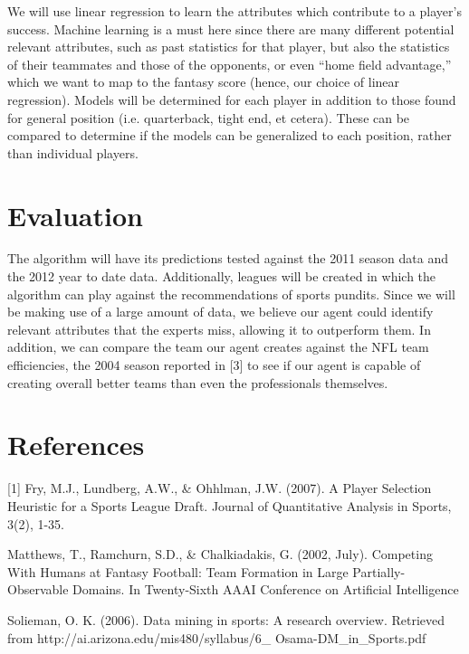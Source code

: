 \documentclass[a4paper,11pt, onecolumn]{article}
\begin{document}
We will use linear regression to learn the attributes which contribute to a player’s success. Machine learning is a must here since there are many different potential relevant attributes, such as past statistics for that player, but also the statistics of their teammates and those of the opponents, or even “home field advantage,” which we want to map to the fantasy score (hence, our choice of linear regression). Models will be determined for each player in addition to those found for general position (i.e. quarterback, tight end, et cetera). These can be compared to determine if the models can be generalized to each position, rather than individual players.

\section{Evaluation}
The algorithm will have its predictions tested against the 2011 season data and the 2012 year to date data. Additionally, leagues will be created in which the algorithm can play against the recommendations of sports pundits. Since we will be making use of a large amount of data, we believe our agent could identify relevant attributes that the experts miss, allowing it to outperform them. In addition, we can compare the team our agent creates against the NFL team efficiencies, the 2004 season reported in [3] to see if our agent is capable of creating overall better teams than even the professionals themselves.

\section{References}
[1] Fry, M.J., Lundberg, A.W., \& Ohhlman, J.W. (2007). A Player Selection Heuristic for a Sports League Draft. Journal of Quantitative Analysis in Sports, 3(2), 1-35.

\noindent[2] Matthews, T., Ramchurn, S.D., \& Chalkiadakis, G. (2002, July). Competing With Humans at Fantasy Football: Team Formation in Large Partially-Observable Domains. In Twenty-Sixth AAAI Conference on Artificial Intelligence

\noindent[3] Solieman, O. K. (2006). Data mining in sports: A research overview. Retrieved from http://ai.arizona.edu/mis480/syllabus/6\_
Osama-DM\_in\_Sports.pdf
\end{document}
